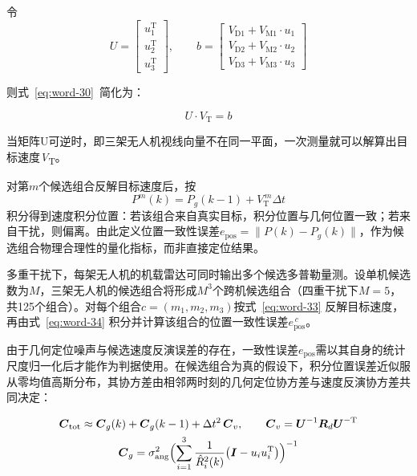 \documentclass[UTF8,a4paper,zihao=-4]{ctexart}
\begin{document}
令
\begin{equation}
U=\begin{bmatrix}u_1^{\mathrm T}\\u_2^{\mathrm T}\\u_3^{\mathrm T}\end{bmatrix},\qquad b=\begin{bmatrix}V_{\mathrm D1}+V_{\mathrm M1}\cdot u_1\\V_{\mathrm D2}+V_{\mathrm M2}\cdot u_2\\V_{\mathrm D3}+V_{\mathrm M3}\cdot u_3\end{bmatrix}
\label{eq:word-31-32}
\end{equation}


则式~\eqref{eq:word-30}~简化为：


\begin{equation}
U\cdot V_{\mathrm T}=b
\label{eq:word-33}
\end{equation}


当矩阵U可逆时，即三架无人机视线向量不在同一平面，一次测量就可以解算出目标速度\emph{V}\textsubscript{T}。

对第\(m\)个候选组合反解目标速度后，按
\begin{equation}
P^m(k)=P_g(k-1)+V_{\mathrm T}^{\,m}\Delta t
\label{eq:word-34}
\end{equation}
积分得到速度积分位置：若该组合来自真实目标，积分位置与几何位置一致；若来自干扰，则偏离。由此定义位置一致性误差\(e_{\mathrm{pos}}=\|P(k)-P_g(k)\|\)，作为候选组合物理合理性的量化指标，而非直接定位结果。

多重干扰下，每架无人机的机载雷达可同时输出多个候选多普勒量测。设单机候选数为\(M\)，三架无人机的候选组合将形成\(M^{3}\)个跨机候选组合（四重干扰下\(M=5\)，共125个组合）。对每个组合\(c=(m_1,m_2,m_3)\)按式~\eqref{eq:word-33} 反解目标速度，再由式~\eqref{eq:word-34} 积分并计算该组合的位置一致性误差\(e_{\mathrm{pos}}^{\,c}\)。

由于几何定位噪声与候选速度反演误差的存在，一致性误差\(e_{\mathrm{pos}}\)需以其自身的统计尺度归一化后才能作为判据使用。在候选组合为真的假设下，积分位置误差近似服从零均值高斯分布，其协方差由相邻两时刻的几何定位协方差与速度反演协方差共同决定：


\begin{equation}
\begin{gathered}
\boldsymbol{C}_{\mathrm{tot}}\approx \boldsymbol{C}_g(k)+\boldsymbol{C}_g(k-1)+\Delta t^2\,\boldsymbol{C}_v,\qquad
\boldsymbol{C}_v=\boldsymbol{U}^{-1}\boldsymbol{R}_d\boldsymbol{U}^{-\mathrm T}\\
\boldsymbol{C}_g=\sigma_{\mathrm{ang}}^2\Bigl(\sum_{i=1}^{3}\frac{1}{\hat{R}_i^2(k)}\bigl(\boldsymbol{I}-u_iu_i^{\mathrm T}\bigr)\Bigr)^{-1}
\end{gathered}
\label{eq:pos-cov}
\end{equation}
\end{document}
